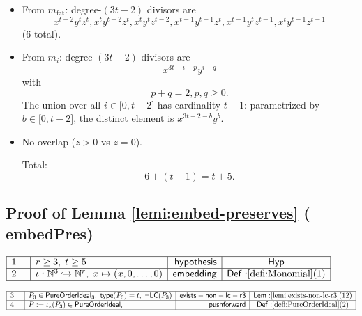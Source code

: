 \documentclass[11pt,reqno]{amsart}
\providecommand{\N}{\mathbb{N}}
\begin{document}
\medskip%

\begin{itemize}
\item From $m_{\mathrm{fat}}$: degree-$(3t-2)$ divisors are 
\begin{equation*}
x^{t-2}y^{t}z^{t},x^{t}y^{t-2}z^{t},x^{t}y^{t}z^{t-2},x^{t-1}y^{t-1}z^{t},x^{t-1}y^{t}z^{t-1},x^{t}y^{t-1}z^{t-1}
\end{equation*}
(6 total).

\item From $m_{i}$: degree-$(3t-2)$ divisors are 
\begin{equation*}
x^{3t-i-p}y^{i-q}
\end{equation*}
with 
\begin{equation*}
p+q=2,p,q\geq 0.
\end{equation*}%
The union over all $i\in \lbrack 0,t-2]$ has cardinality $t-1$: parametrized
by $b\in \lbrack 0,t-2]$, the distinct element is $x^{3t-2-b}y^{b}$.

\item No overlap ($z>0$ vs $z=0$).

\noindent%
Total: 
\begin{equation*}
6+(t-1)=t+5.
\end{equation*}
\end{itemize}

\medskip

\subsection*{Proof of Lemma \protect\ref{lemi:embed-preserves} (\textsf{%
embedPres})}

\noindent $%
\begin{array}{|m{0.5cm}|l|r|c|}
\hline
1 & r\geq 3,\;t\geq 5 & \mathsf{hypothesis} & \mathsf{Hyp} \\ \hline
2 & \iota :\N^{3}\hookrightarrow \N^{r},\;x\mapsto (x,0,\dots ,0) & \mathsf{%
embedding} & \mathsf{Def:}\ref{defi:Monomial}(1) \\ \hline
\end{array}%
$

\nointerlineskip\noindent$%
\begin{array}{|m{0.5cm}|l|r|c|}
\hline
3 & P_{3}\in\mathsf{PureOrderIdeal}_{3},\;\mathsf{type}(P_{3})=t,\;\neg%
\mathsf{LC}(P_{3}) & \mathsf{exists-non-lc-r3} & \mathsf{Lem:}\ref%
{lemi:exists-non-lc-r3}(12) \\ \hline
4 & P:=\iota_{*}(P_{3})\in\mathsf{PureOrderIdeal}_{r} & \mathsf{pushforward}
& \mathsf{Def:}\ref{defi:PureOrderIdeal}(2) \\ \hline
\end{array}%
$
\end{document}
